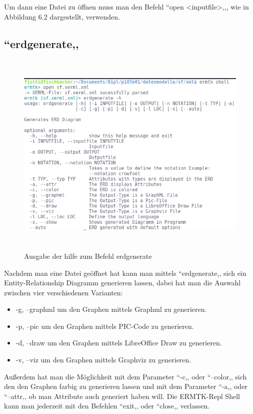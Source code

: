 \noindent
Um dann eine Datei zu öffnen muss man den Befehl ``open <inputfile>,,, wie in Abbildung 6.2 dargestellt, verwenden.

\subsection{``erdgenerate,,}

\begin{figure}[H]
	\begin{center}
		\includegraphics[width=16cm, height=10cm]{images/help.png}
		\caption{Ausgabe der hilfe zum Befehl erdgenerate}
		\label{erdgenerate}
	\end{center}
\end{figure}

\noindent
Nachdem man eine Datei geöffnet hat kann man mittels ``erdgenerate,, sich ein Entity-Relationship Diagramm generieren lassen, dabei hat man die Auswahl zwischen vier verschiedenen Varianten:
\begin{itemize}
    \item -g, --graphml um den Graphen mittels Graphml zu generieren.
    \item -p, --pic um den Graphen mittels PIC-Code zu generieren.
    \item -d, --draw um den Graphen mittels LibreOffice Draw zu generieren.
    \item -v, --viz um den Graphen mittels Graphviz zu generieren.
\end{itemize}
\fib{}
\noindent
Außerdem hat man die Möglichkeit mit dem Parameter ``-c,, oder ``--color,, sich den den Graphen farbig zu generieren lassen und mit dem Parameter ``-a,, oder ``--attr,, ob man Attribute auch generiert haben will.
Die ERMTK-Repl Shell kann man jederzeit mit den Befehlen ``exit,, oder ``close,, verlassen.